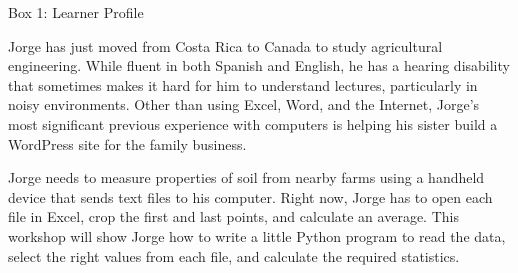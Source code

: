 \documentclass[10pt,letterpaper]{article}
\begin{document}
\begin{mdframed}

\noindent
Box 1: Learner Profile

Jorge has just moved from Costa Rica to Canada to study agricultural engineering.
While fluent in both Spanish and English,
he has a hearing disability that sometimes makes it hard for him to understand lectures,
particularly in noisy environments.
Other than using Excel, Word, and the Internet,
Jorge's most significant previous experience with computers is
helping his sister build a WordPress site for the family business.

Jorge needs to measure properties of soil from nearby farms
using a handheld device that sends text files to his computer.
Right now, Jorge has to open each file in Excel,
crop the first and last points,
and calculate an average.
This workshop will show Jorge how to write a little Python program
to read the data,
select the right values from each file,
and calculate the required statistics.

\end{mdframed}
\end{document}
